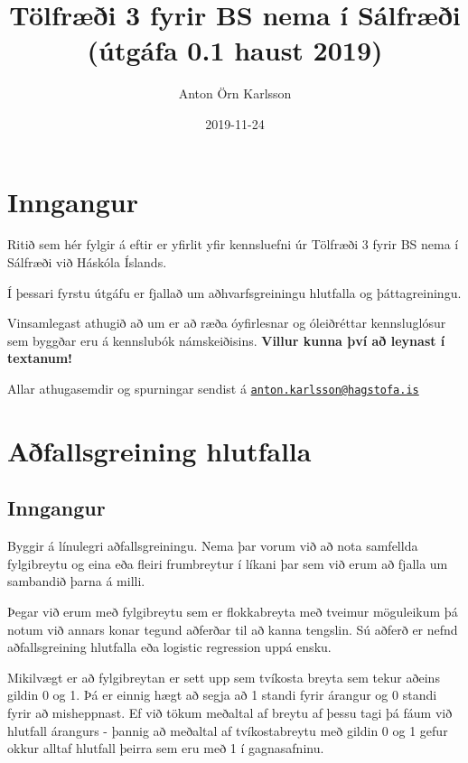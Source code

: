 \documentclass[]{book}
\title{Tölfræði 3 fyrir BS nema í Sálfræði (útgáfa 0.1 haust 2019)}
\author{Anton Örn Karlsson}
\date{2019-11-24}
\begin{document}
\maketitle

{
\setcounter{tocdepth}{1}
\tableofcontents
}
\hypertarget{inngangur}{%
\chapter{Inngangur}\label{inngangur}}

Ritið sem hér fylgir á eftir er yfirlit yfir kennsluefni úr Tölfræði 3 fyrir BS nema í Sálfræði við Háskóla Íslands.

Í þessari fyrstu útgáfu er fjallað um aðhvarfsgreiningu hlutfalla og þáttagreiningu.

Vinsamlegast athugið að um er að ræða óyfirlesnar og óleiðréttar kennsluglósur sem byggðar eru á kennslubók námskeiðisins. \textbf{Villur kunna því að leynast í textanum!}

Allar athugasemdir og spurningar sendist á \href{mailto:anton.karlsson@hagstofa.is}{\nolinkurl{anton.karlsson@hagstofa.is}}

\hypertarget{auxf0fallsgreining-hlutfalla}{%
\chapter{Aðfallsgreining hlutfalla}\label{auxf0fallsgreining-hlutfalla}}

\hypertarget{logreg-inngangur}{%
\section{Inngangur}\label{logreg-inngangur}}

Byggir á línulegri aðfallsgreiningu. Nema þar vorum við að nota samfellda fylgibreytu og eina eða fleiri frumbreytur í líkani þar sem við erum að fjalla um sambandið þarna á milli.

Þegar við erum með fylgibreytu sem er flokkabreyta með tveimur möguleikum þá notum við annars konar tegund aðferðar til að kanna tengslin. Sú aðferð er nefnd aðfallsgreining hlutfalla eða logistic regression uppá ensku.

Mikilvægt er að fylgibreytan er sett upp sem tvíkosta breyta sem tekur aðeins gildin 0 og 1. Þá er einnig hægt að segja að 1 standi fyrir árangur og 0 standi fyrir að misheppnast. Ef við tökum meðaltal af breytu af þessu tagi þá fáum við hlutfall árangurs - þannig að meðaltal af tvíkostabreytu með gildin 0 og 1 gefur okkur alltaf hlutfall þeirra sem eru með 1 í gagnasafninu.
\end{document}
